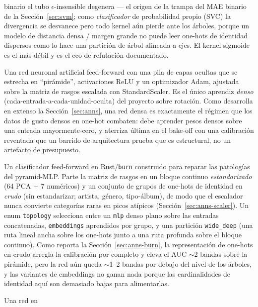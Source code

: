 \documentclass[11pt]{article}
\begin{document}
\begin{description}
  binario el tubo $\epsilon$-insensible degenera --- el origen de la trampa del
  MAE binario de la Sección~\ref{sec:svm}; como \emph{clasificador} de
  probabilidad propio (SVC) la divergencia se desvanece pero todo kernel aún
  pierde ante los árboles, porque un modelo de distancia densa / margen grande no
  puede leer one-hots de identidad dispersos como lo hace una partición de árbol
  alineada a ejes. El kernel sigmoide es el más débil y es el eco de refutación
  documentado.
  \item[Pyramid-MLP (\texttt{pyramid-mlp-classifier}).] Una red neuronal
  artificial feed-forward con una pila de capas ocultas que se estrecha en
  ``pirámide'', activaciones ReLU y un optimizador Adam, ajustada sobre la matriz
  de rasgos escalada con StandardScaler. Es el único aprendiz \emph{denso}
  (cada-entrada-a-cada-unidad-oculta) del proyecto sobre rotación. Como
  desarrolla en extenso la Sección~\ref{sec:anns}, una red densa es exactamente
  el régimen que los datos de gusto densos en one-hot combaten: debe aprender
  pesos densos sobre una entrada mayormente-cero, y aterriza última en el
  bake-off con una calibración reventada que un barrido de arquitectura prueba
  que es estructural, no un artefacto de presupuesto.
  \item[Red consciente de la representación (\texttt{burn-deep-classifier}).] Un
  clasificador feed-forward en Rust/\texttt{burn} construido para reparar las
  patologías del pyramid-MLP. Parte la matriz de rasgos en un bloque continuo
  \emph{estandarizado} (64 PCA $+$ 7 numéricos) y un conjunto de grupos de
  one-hots de identidad en \emph{crudo} (sin estandarizar; artista, género,
  tipo-álbum), de modo que el escalador nunca convierte categorías raras en
  picos atípicos (Sección~\ref{sec:anns-scaler}). Un enum \texttt{topology}
  selecciona entre un \texttt{mlp} denso plano sobre las entradas concatenadas,
  \texttt{embeddings} aprendidos por grupo, y una partición \texttt{wide\_deep}
  (una ruta lineal ancha sobre los one-hots junto a una ruta profunda sobre el
  bloque continuo). Como reporta la Sección~\ref{sec:anns-burn}, la
  representación de one-hots en crudo arregla la calibración por completo y eleva
  el AUC $\sim$2 bandas sobre la pirámide, pero la red aún queda $\sim$1--2
  bandas por debajo del nivel de los árboles, y las variantes de embeddings no
  ganan nada porque las cardinalidades de identidad aquí son demasiado bajas para
  alimentarlas.
  \item[Red de trasplante AE (\texttt{burn-ae-classifier}).] Una red en

\end{description}
\end{document}
